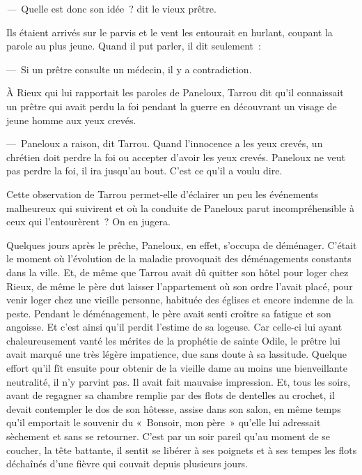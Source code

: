 \documentclass[french,twoside]{book} %
\begin{document}
\emph{—} Quelle est donc son idée ? dit le vieux prêtre.\par
Ils étaient arrivés sur le parvis et le vent les entourait en hurlant, coupant la parole au plus jeune. Quand il put parler, il dit seulement :\par
— Si un prêtre consulte un médecin, il y a contradiction.\par
À Rieux qui lui rapportait les paroles de Paneloux, Tarrou dit qu’il connaissait un prêtre qui avait perdu la foi pendant la guerre en découvrant un visage de jeune homme aux yeux crevés.\par
— Paneloux a raison, dit Tarrou. Quand l’innocence a les yeux crevés, un chrétien doit perdre la foi ou accepter d’avoir les yeux crevés. Paneloux ne veut pas perdre la foi, il ira jusqu’au bout. C’est ce qu’il a voulu dire.\par
Cette observation de Tarrou permet-elle d’éclairer un peu les événements malheureux qui suivirent et où la conduite de Paneloux parut incompréhensible à ceux qui l’entourèrent ? On en jugera.\par
Quelques jours après le prêche, Paneloux, en effet, s’occupa de déménager. C’était le moment où l’évolution de la maladie provoquait des déménagements constants dans la ville. Et, de même que Tarrou avait dû quitter son hôtel pour loger chez Rieux, de même le père dut laisser l’appartement où son ordre l’avait placé, pour venir loger chez une vieille personne, habituée des églises et encore indemne de la peste. Pendant le déménagement, le père avait senti croître sa fatigue et son angoisse. Et c’est ainsi qu’il perdit l’estime de sa logeuse. Car celle-ci lui ayant chaleureusement vanté les mérites de la prophétie de sainte Odile, le prêtre lui avait marqué une très légère impatience, due sans doute à sa lassitude. Quelque effort qu’il fît ensuite pour obtenir de la vieille dame au moins une bienveillante neutralité, il n’y parvint pas. Il avait fait mauvaise impression. Et, tous les soirs, avant de regagner sa chambre remplie par des flots de dentelles au crochet, il devait contempler le dos de son hôtesse, assise dans son salon, en même temps qu’il emportait le souvenir du « Bonsoir, mon père » qu’elle lui adressait sèchement et sans se retourner. C’est par un soir pareil qu’au moment de se coucher, la tête battante, il sentit se libérer à ses poignets et à ses tempes les flots déchaînés d’une fièvre qui couvait depuis plusieurs jours.\par
\end{document}
